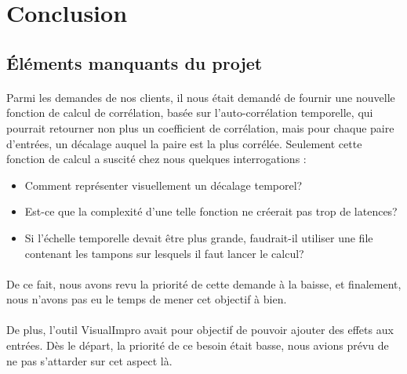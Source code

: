\newpage
\section{Conclusion}
\subsection{Éléments manquants du projet}
\paragraph{}
Parmi les demandes de nos clients, il nous était demandé de fournir une nouvelle fonction de calcul de corrélation, basée sur l'auto-corrélation temporelle, qui pourrait retourner non plus un coefficient de corrélation, mais pour chaque paire d'entrées, un décalage auquel la paire est la plus corrélée. Seulement cette fonction de calcul a suscité chez nous quelques interrogations :
\begin{itemize}
    \item Comment représenter visuellement un décalage temporel?
    \item Est-ce que la complexité d'une telle fonction ne créerait pas trop de latences?
    \item Si l'échelle temporelle devait être plus grande, faudrait-il utiliser une file contenant les tampons sur lesquels il faut lancer le calcul?
\end{itemize}
\paragraph{}
De ce fait, nous avons revu la priorité de cette demande à la baisse, et finalement, nous n'avons pas eu le temps de mener cet objectif à bien.
\paragraph{}
De plus, l'outil VisualImpro avait pour objectif de pouvoir ajouter des effets aux entrées. Dès le départ, la priorité de ce besoin était basse, nous avions prévu de ne pas s'attarder sur cet aspect là.
\paragraph{}


